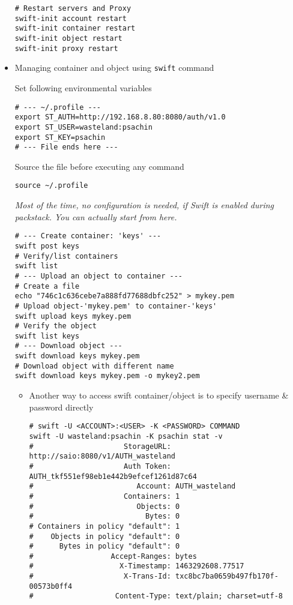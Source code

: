 \documentclass{article}
\begin{document}
\begin{itemize}
\begin{verbatim}
# Restart servers and Proxy
swift-init account restart
swift-init container restart
swift-init object restart
swift-init proxy restart
\end{verbatim}
\item Managing container and object using \texttt{swift} command

Set following environmental variables
\begin{verbatim}
# --- ~/.profile ---
export ST_AUTH=http://192.168.8.80:8080/auth/v1.0
export ST_USER=wasteland:psachin
export ST_KEY=psachin
# --- File ends here ---
\end{verbatim}

Source the file before executing any command
\begin{verbatim}
source ~/.profile
\end{verbatim}

\emph{Most of the time, no configuration is needed, if Swift is
enabled during packstack. You can actually start from here.}
\begin{verbatim}
# --- Create container: 'keys' ---
swift post keys
# Verify/list containers
swift list
# --- Upload an object to container ---
# Create a file
echo "746c1c636cebe7a888fd77688dbfc252" > mykey.pem
# Upload object-'mykey.pem' to container-'keys'
swift upload keys mykey.pem
# Verify the object
swift list keys
# --- Download object ---
swift download keys mykey.pem
# Download object with different name
swift download keys mykey.pem -o mykey2.pem
\end{verbatim}

\begin{itemize}
\item Another way to access swift container/object is to specify
username \& password directly
\begin{verbatim}
# swift -U <ACCOUNT>:<USER> -K <PASSWORD> COMMAND
swift -U wasteland:psachin -K psachin stat -v
#                     StorageURL: http://saio:8080/v1/AUTH_wasteland
#                     Auth Token: AUTH_tkf551ef98eb1e442b9efcef1261d87c64
#                        Account: AUTH_wasteland
#                     Containers: 1
#                        Objects: 0
#                          Bytes: 0
# Containers in policy "default": 1
#    Objects in policy "default": 0
#      Bytes in policy "default": 0
#                  Accept-Ranges: bytes
#                    X-Timestamp: 1463292608.77517
#                     X-Trans-Id: txc8bc7ba0659b497fb170f-00573b0ff4
#                   Content-Type: text/plain; charset=utf-8


\end{verbatim}
\end{itemize}
\end{itemize}
\end{document}

